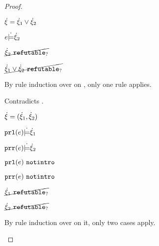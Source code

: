 \begin{proof}
\begin{byCases}
\item[\text{(\ref{rule:CSOr2})}]
    \begin{pfsteps*}
    \item $\dot{\xi}=\dot{\xi}_1 \vee \dot{\xi}_2$ 
    \item $e \dot{\models} \dot{\xi}_2$  
    \item $\cancel{\dot{\xi}_2 ~\mathtt{refutable}_?}$  
    \item $\cancel{\dot{\xi}_1 \vee \dot{\xi}_2 ~\mathtt{refutable}_?}$ 
    \end{pfsteps*}
    By rule induction over  on , only one rule applies.
    \begin{byCases}
      \item[\text{(\ref{rule:RXOr})}]
      \begin{pfsteps}
      \item {} 
      \end{pfsteps} 
      Contradicts .
    \end{byCases}
\item[\text{(\ref{rule:CSNotIntroPair})}]
    \begin{pfsteps*}
    \item $\dot{\xi}=(\dot{\xi}_1 , \dot{\xi}_2)$ 
    \item $\mathtt{prl}(e) \dot{\models} \dot{\xi}_1$  
    \item $\mathtt{prr}(e) \dot{\models} \dot{\xi}_2$  
    \item $\mathtt{prl}(e) ~\mathtt{notintro}$  
    \item $\mathtt{prr}(e) ~\mathtt{notintro}$  
    \item $\cancel{\dot{\xi}_1 ~\mathtt{refutable}_?}$  
    \item $\cancel{\dot{\xi}_2 ~\mathtt{refutable}_?}$  
    \end{pfsteps*}
    By rule induction over  on it, only two cases apply.
    \begin{byCases}
    \item[\text{(\ref{rule:RXPairL})}]

\end{byCases}
\end{byCases}
\end{proof}
